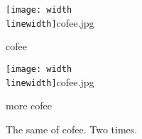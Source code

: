 \documentclass{article}
\begin{document}
   	\begin{figure}[h!]
   		\centering
   			\begin{subfiguring}[b]{0.4\linewidth}
   		\texttt{[image: width\\linewidth]}{cofee.jpg}
   				\caption{cofee}
   			\end{subfiguring}
   			\begin{subfiguring}[b]{0.4\linewidth}
   			\texttt{[image: width\\linewidth]}{cofee.jpg}
   			\caption{more cofee}
   		
   	\end{subfiguring}
 \caption{The same of cofee. Two times.}  	
   \end{figure}
   
\end{document}
